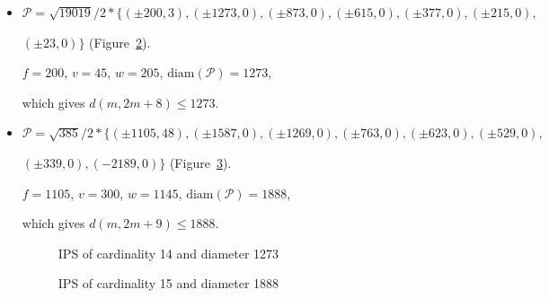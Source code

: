 \documentclass[12pt]{article}
\theoremstyle{theorem}
\theoremstyle{dfn}
\theoremstyle{remark}
\begin{document}
\begin{itemize}
$
(-1273 , 0)\}
$
(Figure~\ref{picture_6.png}).

$f = 200$, $v = 45$, $w = 205$, $\operatorname{diam(\mathcal{P})} = 1073$,

which gives $d(m, 2m + 7) \leq 1073$.


\begin{figure}[h!]
\parbox{0.7\linewidth}{\caption{IPS of cardinality 13 and diameter 1073}
\label{picture_6.png}}
\end{figure}


\item
$\mathcal{P}=\sqrt{19019}/{2} * \{ (\pm 200, 3),
(\pm 1273 , 0),
(\pm 873 , 0),
(\pm 615 , 0),
(\pm 377 , 0),
(\pm 215 , 0),
$

$
(\pm 23 , 0)\}
$
(Figure~\ref{picture_7.png}).

$f = 200$, $v = 45$, $w = 205$, $\operatorname{diam(\mathcal{P})} = 1273$,

which gives $d(m, 2m + 8) \leq 1273$.


\item
$\mathcal{P}=\sqrt{385}/{2} * \{ (\pm 1105, 48),
(\pm 1587 , 0),
(\pm 1269 , 0),
(\pm 763 , 0),
(\pm 623 , 0),
(\pm 529 , 0),
$

$
(\pm 339 , 0),
(-2189 , 0)\}
$
(Figure~\ref{picture_8.png}).

$f = 1105$, $v = 300$, $w = 1145$, $\operatorname{diam(\mathcal{P})} = 1888$,

which gives $d(m, 2m + 9) \leq 1888$.


\begin{figure}[h!]
\parbox{0.7\linewidth}{\caption{IPS of cardinality 14 and diameter 1273}
\label{picture_7.png}}
\end{figure}


\begin{figure}[h!]
\parbox{0.75\linewidth}{\caption{IPS of cardinality 15 and diameter 1888}
\label{picture_8.png}}
\end{figure}



\end{itemize}
\end{document}
